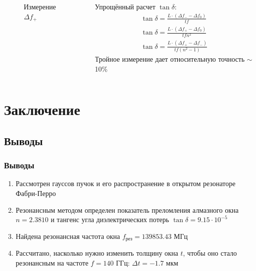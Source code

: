 \begin{frame}[c]
\begin{columns}[c]
\begin{column}{0.49\textwidth}
\begin{figure}[H]
				\caption{Измерение $\Delta f_+$}
				\label{fig:chem}
			\end{figure}
		\end{column}
		\begin{column}{0.49\textwidth}%
			Упрощённый расчет $\tan\delta$:
			\begin{gather*}
				\tan\delta=\frac{L\cdot(\Delta f_--\Delta f_0)}{tf}\\
				\tan\delta=\frac{L\cdot(\Delta f_+-\Delta f_0)}{tfn^2}\\
				\tan\delta=\frac{L\cdot(\Delta f_+-\Delta f_-)}{tf(n^2-1)}
			\end{gather*}
			Тройное измерение дает относительную точность $\sim$ 10\%
		\end{column}
	\end{columns}
		
\end{frame}

\section{Заключение}
\subsection{Выводы}
\begin{frame}
	\frametitle{Выводы}
	\begin{enumerate}
			\item Рассмотрен гауссов пучок и его распространение в открытом резонаторе Фабри-Перро
			\item Резонансным методом определен показатель преломления алмазного окна $n=2.3810$ и тангенс угла диэлектрических потерь $\tan\delta=9.15\cdot10^{-5}$
			\item Найдена резонансная частота окна $f_\text{рез}=139853.43$ МГц
			\item Рассчитано, насколько нужно изменить толщину окна $t$, чтобы оно стало резонансным на частоте $f=140$ ГГц: $\Delta t=-1.7$ мкм 
	\end{enumerate}
\end{frame}

